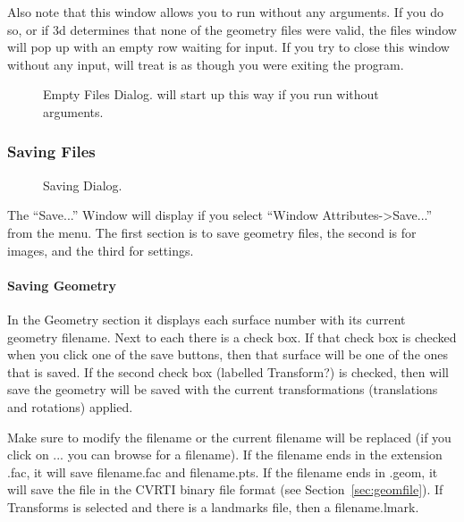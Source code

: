 Also note that this window allows you to run \map{} without any arguments.
If you do so, or if \map3d{} determines that none of the geometry files
were valid, the files window will pop up with an empty row waiting for
input.  If you try to close this window without any input, \map{} will
treat is as though you were exiting the program.

\begin{figure}[htb]
  \begin{makeimage}
  \end{makeimage}
  \filesdialogthree
  \caption{\label{fig:file3} Empty Files Dialog. \map{} will start up this way
            if you run without arguments.}
\end{figure}



\subsubsection{Saving Files}
\label{sec:saving}

\begin{figure}[htb]
  \begin{makeimage}
  \end{makeimage}
  \savedialog
  \caption{\label{fig:save1} Saving Dialog.}
\end{figure}


The ``Save...'' Window will display if you select ``Window
Attributes->Save...''  from the menu.  The first section is to save
geometry files, the second is for images, and the third for settings.

\paragraph{Saving Geometry}
\label{sec:savegeom}

In the Geometry section it displays each surface number with its current
geometry filename.  Next to each there is a check box.  If that check box
is checked when you click one of the save buttons, then that surface will
be one of the ones that is saved.  If the second check box (labelled
Transform?) is checked, then \map{} will save the geometry will be saved
with the current transformations (translations and rotations) applied.

Make sure to modify the filename or the current filename will be replaced
(if you click on ... you can browse for a filename).  If the filename ends
in the extension .fac, it will save filename.fac and filename.pts.  If the
filename ends in .geom, it will save the file in the CVRTI binary file
format (see Section~\ref{sec:geomfile}). If Transforms is selected and
there is a landmarks file, then a filename.lmark.

